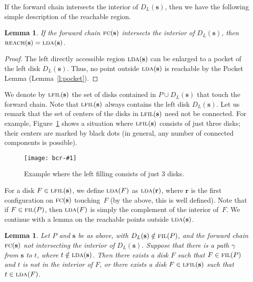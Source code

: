 \documentclass[a4paper]{article}
\newcommand{\vecs}{{\mathbf{s}}}
\newcommand{\vecr}{{\mathbf{r}}}
\newcommand{\ldisk}{{D_L}}
\DeclareMathOperator{\reach}{\textsc{reach}}
\DeclareMathOperator{\FIL}{\textsc{fil}}
\DeclareMathOperator{\LFIL}{\textsc{lfil}}
\DeclareMathOperator{\LDA}{\textsc{lda}}
\DeclareMathOperator{\FC}{\textsc{fc}}
\newtheorem{lemma}[theorem]{Lemma}
\newcommand{\epsfigure}[2]{
  \begin{figure}[htb]
    \centerline{\texttt{[image: bcr-\#1]}}
    \caption{#2}
    \label{f:#1}
  \end{figure}}
\begin{document}
If the forward chain intersects the interior of $\ldisk(\vecs)$, then we 
have the following simple description of the reachable region.
\begin{lemma}\label{lem:pocketreach}
  If the forward chain $\FC(\vecs)$ intersects the interior of $\ldisk(\vecs)$,
  then $\reach(\vecs) = \LDA(\vecs)$.
\end{lemma}
\begin{proof}
  The left directly accessible region $\LDA(\vecs)$ can be enlarged 
  to a pocket of the
  left disk $\ldisk(\vecs)$. Thus, no point outside $\LDA(\vecs)$ is
  reachable by the Pocket Lemma (Lemma~\ref{l:pocket}).
\end{proof}
 
We denote by $\LFIL(\vecs)$ the set of disks contained in $P \cup
\ldisk(\vecs)$ that touch the forward chain.  Note that $\LFIL(\vecs)$
always contains the left disk $\ldisk(\vecs)$.  Let us remark that the
set of centers of the disks in $\LFIL(\vecs)$ need not be connected.
For example, Figure~\ref{f:nonc} shows a situation where
$\LFIL(\vecs)$ consists of just three disks; their centers are marked by
black dots (in general, any number of connected components is
possible).
\epsfigure{nonc}{Example where the left filling consists of just 3
  disks.} 
For a disk $F \in \LFIL(\vecs)$, we define $\LDA(F)$ as
$\LDA(\vecr)$, where $\vecr$ is the first configuration on $\FC(\vecs)$
touching~$F$ (by the above, this is well defined).  Note
that if $F \in \FIL(P)$, then $\LDA(F)$ is simply the complement of the
interior of~$F$.
We continue with a lemma on the reachable
points outside $\LDA(\vecs)$.
\begin{lemma}\label{l:tinDL}
  Let $P$ and $\vecs$ be as above, with $\ldisk(\vecs)\notin
  \FIL(P)$, and the forward chain $\FC(\vecs)$ not intersecting the
  interior of $\ldisk(\vecs)$.  
  Suppose that there is a path $\gamma$ from $\vecs$ to
  $t$, where $t \notin \LDA(\vecs)$. Then there exists a disk
  $F$ such that $F \in \FIL(P)$ and $t$ is not in the interior of $F$, 
  or there
  exists a disk $F \in \LFIL(\vecs)$  such that $t \in \LDA(F)$.
\end{lemma}
\end{document}
